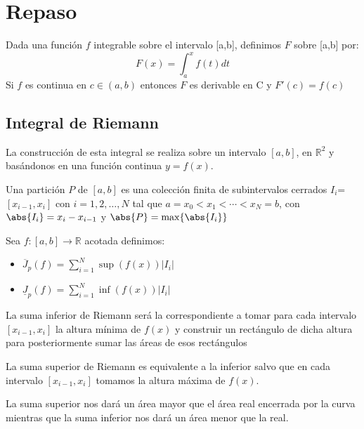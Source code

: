 \documentclass{apuntes}
\begin{document}
\chapter{Repaso}
\begin{theorem}
Dada una función $f$ integrable sobre el intervalo [a,b], definimos $F$ sobre [a,b] por:
\[F(x)=\int_{a}^{x}f(t)dt\]
Si $f$ es continua en $c\in (a,b)$ entonces $F$ es derivable en C y $F'(c)=f(c)$
\end{theorem}

\section{Integral de Riemann}
La construcción de esta integral se realiza sobre un intervalo $[a,b]$, en $\mathbb{R}^2$ y basándonos en una función continua $y=f(x)$.

\begin{defn}[Partición]
Una partición $P$ de $[a,b]$ es una colección finita de subintervalos cerrados $I_i$=$[x_{i-1}, x_i]$ con $i=1,2,\dotsc,N$ tal que $a=x_0<x_1<\cdots < x_N=b$, con $\abs{I_i} = x_i-x_{i-1}$ y $\abs{P} = \max \lbrace \abs{I_i} \rbrace$
\end{defn}


Sea $f:[ a,b ] \rightarrow \mathbb{R}$ acotada definimos:
\begin{itemize}
\item \begin{defn}
$\overline{J}_p(f)=\sum_{i=1}^{N}\sup(f(x))|I_i|$
\end{defn}

\item \begin{defn}
$\underline{J}_p(f)=\sum_{i=1}^{N}\inf(f(x))|I_i|$
\end{defn}
\end{itemize}

La suma inferior de Riemann será la correspondiente a tomar para cada intervalo $[x_{i-1}, x_i]$ la altura mínima de $f(x)$ y construir un rectángulo de dicha altura para posteriormente sumar las áreas de esos rectángulos

La suma superior de Riemann es equivalente a la inferior salvo que en cada intervalo $[x_{i-1}, x_i]$ tomamos la altura máxima de $f(x)$.

La suma superior nos dará un área mayor que el área real encerrada por la curva mientras que la suma inferior nos dará un área menor que la real.
\end{document}
